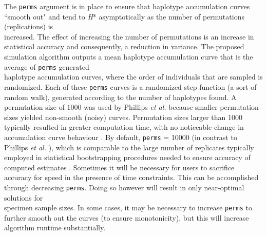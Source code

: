 The {\tt perms} argument is in place to ensure that haplotype accumulation curves ``smooth out" and tend to \textit{H}* asymptotically as the number of permutations (replications) is \\ increased. The effect of increasing the number of permutations is an increase in statistical accuracy and consequently, a reduction in variance. The proposed simulation algorithm outputs a mean haplotype accumulation curve that is the average of {\tt perms} generated \\ haplotype accumulation curves, where the order of individuals that are sampled is \\ randomized. Each of these {\tt perms} curves is a randomized step function (a sort of random walk), generated according to the number of haplotypes found. A permutation size of 1000 was used by Phillips \textit{et al.} \cite{phillips2015exploration} because smaller permutation sizes yielded non-smooth (noisy) curves. Permutation sizes larger than 1000 typically resulted in greater computation time, with no noticeable change in accumulation curve behaviour \cite{phillips2015exploration}. By default, {\tt perms} = 10000 (in contrast to Phillips \textit{et al.} \cite{phillips2015exploration}), which is comparable to the large number of replicates typically employed in statistical bootstrapping procedures needed to ensure accuracy of computed estimates \cite{efron1979boot}. Sometimes it will be necessary for users to sacrifice accuracy for speed in the presence of time constraints. This can be accomplished through decreasing {\tt perms}. Doing so however will result in only near-optimal solutions for \\ specimen sample sizes. In some cases, it may be necessary to increase {\tt perms} to further smooth out the curves (to ensure monotonicity), but this will increase algorithm runtime substantially.

